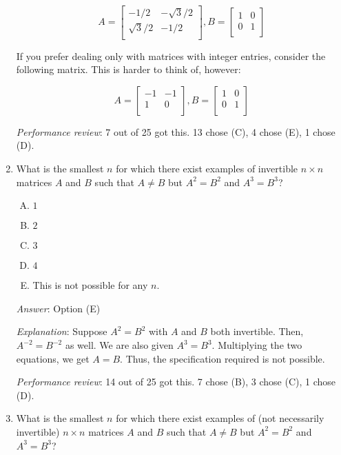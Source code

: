 \documentclass[10pt]{amsart}
\begin{document}
\begin{enumerate}
  $$A = \left[\begin{matrix} -1/2 & -\sqrt{3}/2 \\ \sqrt{3}/2 & -1/2 \\\end{matrix}\right], B = \left[\begin{matrix} 1 & 0 \\ 0 & 1 \\\end{matrix}\right]$$

  If you prefer dealing only with matrices with integer entries, consider the following matrix. This is harder to think of, however:

  $$A = \left[\begin{matrix} -1 & -1 \\ 1 & 0 \\\end{matrix}\right], B = \left[\begin{matrix} 1 & 0 \\0 & 1 \\\end{matrix}\right]$$

  {\em Performance review}: 7 out of 25 got this. 13 chose (C), 4
  chose (E), 1 chose (D).
\item What is the smallest $n$ for which there exist examples of
  invertible $n \times n$ matrices $A$ and $B$ such that $A \ne B$ but
  $A^2 = B^2$ and $A^3 = B^3$?

  \begin{enumerate}[(A)]
  \item $1$
  \item $2$
  \item $3$
  \item $4$
  \item This is not possible for any $n$.
  \end{enumerate}

  {\em Answer}: Option (E)

  {\em Explanation}: Suppose $A^2 = B^2$ with $A$ and $B$ both
  invertible. Then, $A^{-2} = B^{-2}$ as well. We are also given $A^3
  = B^3$. Multiplying the two equations, we get $A = B$. Thus, the
  specification required is not possible.

  {\em Performance review}: 14 out of 25 got this. 7 chose (B), 3
  chose (C), 1 chose (D).
\item What is the smallest $n$ for which there exist examples of (not
  necessarily invertible) $n \times n$ matrices $A$ and $B$ such that
  $A \ne B$ but $A^2 = B^2$ and $A^3 = B^3$?


\end{enumerate}
\end{document}
